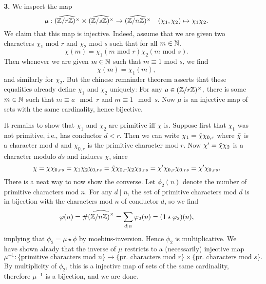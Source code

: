 \documentclass[a4paper,11pt]{article}
\begin{document}
\textbf{3.} 
%
We inspect the map 
\[
    \mu: \widehat{(\mathbb{Z}/r\mathbb{Z})^\times} \times \widehat{(\mathbb{Z}/s\mathbb{Z})^\times} \to
    \widehat{(\mathbb{Z}/n\mathbb{Z})^\times} \quad (\chi_1, \chi_2) \mapsto \chi_1\chi_2.
\]
We claim that this map is injective. Indeed, assume that we are given two
characters $\chi_1$ mod $r$ 
and $\chi_2$ mod $s$ such that for all $m \in \mathbb{N}$, 
\[
    \chi(m) = \chi_1(m \text{ mod $r$}) \chi_2(m \text{ mod $s$}).
\]
Then whenever we are given $m \in \mathbb{N}$ such that $m \equiv 1$ mod $s$, we find 
\[
    \chi(m) = \chi_1(m),
\]
and similarly for $\chi_2$. But the chinese remainder theorem asserts that
these equalities already define $\chi_1$ and $\chi_2$ uniquely: For any $a \in
(\mathbb{Z}/r\mathbb{Z})^\times$, there is some $m \in \mathbb{N}$ such that $m \equiv a \mod r$ and 
$m \equiv 1 \mod s$. Now $\mu$ is an injective map of sets with the same cardinality,
hence bijective.

It remains to show that $\chi_1$ and $\chi_2$ are primitive iff $\chi$ is. Suppose first
that $\chi_1$ was not primitive, i.e., has conductor $d < r$. Then we can write 
$\chi_1 = \Tilde \chi \chi_{0,r}$ where $\Tilde\chi$ is a character mod $d$ and 
$\chi_{0,r}$ is the primitive character mod $r$. Now $\chi' = \Tilde \chi \chi_2$ 
is a character modulo $ds$ and induces $\chi$, since
\[
    \chi = \chi \chi_{0,rs} = \chi_1 \chi_2 \chi_{0,rs} = \Tilde \chi \chi_{0,r}\chi_2
    \chi_{0,rs} = \chi' \chi_{0,r} \chi_{0,rs} = \chi' \chi_{0,rs}.
\]
There is a neat way to now show the converse. Let $\phi_2(n)$ denote the number of 
primitive characters mod $n$. For any $d \mid n$, the set of primitive characters
mod $d$ is in bijection with the characters mod $n$ of conductor $d$, so we find
\[
    \varphi(n) = \# \widehat{\left( \mathbb{Z} /n \mathbb{Z} \right)^\times} = \sum_{d \mid n} \varphi_2(n) = (1 \star \varphi_2)(n),
\]
implying that $\phi_2 = \mu \star \phi$ by moebius-inversion. Hence $\phi_2$ is 
multiplicative. We have shown alrady that the inverse of $\mu$ restricts to a
(necessarily) injective map
\[
    \mu^{-1}: \text{\{primitive characters mod $n$\}} \to \text{\{pr.
    characters mod $r$\}} \times \text{\{pr. characters mod $s$\}}. 
\]
By multiplicity of $\phi_2$, this is a injective map of sets of the same cardinality,
therefore $\mu^{-1}$ is a bijection, and we are done. 
\end{document}
